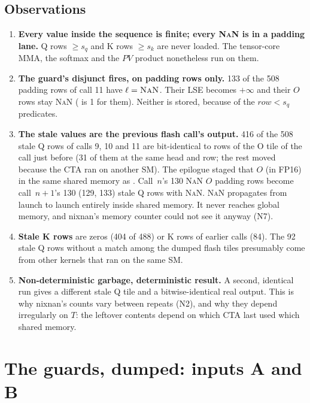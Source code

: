 \documentclass[10pt]{article}
\newcommand{\code}[1]{\texttt{\detokenize{#1}}}
\newcommand{\NaN}{\textsc{NaN}}
\begin{document}
\subsection{Observations}
\begin{enumerate}[label=\textbf{P\arabic*.}]
\item \textbf{Every value inside the sequence is finite; every \NaN{} is in a padding lane.} Q rows
  $\ge s_q$ and K rows $\ge s_k$ are never loaded. The tensor-core MMA, the softmax and the $PV$
  product nonetheless run on them.
\item \textbf{The \code{softmax.h} guard's \code{sum != sum} disjunct fires, on padding rows only.}
  133 of the 508 padding rows of call 11 have $\ell=\NaN$. Their LSE becomes $+\infty$ and their
  $O$ rows stay \NaN{} (\code{inv_sum} is 1 for them). Neither is stored, because of the
  $row<s_q$ predicates.
\item \textbf{The stale values are the previous flash call's output.} 416 of the 508 stale Q rows
  of calls 9, 10 and 11 are bit-identical to rows of the O tile of the call just before (31 of
  them at the same head and row; the rest moved because the CTA ran on another SM). The epilogue
  staged that $O$ (in FP16) in the same shared memory as \code{sQ}. Call~$n$'s 130 \NaN{} $O$
  padding rows become call~$n{+}1$'s 130 (129, 133) stale Q rows with \NaN{}. \NaN{} propagates
  from launch to launch entirely inside shared memory. It never reaches global memory, and nixnan's
  memory counter could not see it anyway (N7).
\item \textbf{Stale K rows} are zeros (404 of 488) or K rows of earlier calls (84). The 92 stale Q
  rows without a match among the dumped flash tiles presumably come from other kernels that ran on
  the same SM.
\item \textbf{Non-deterministic garbage, deterministic result.} A second, identical run gives a
  different stale Q tile and a bitwise-identical real output. This is why nixnan's counts vary
  between repeats (N2), and why they depend irregularly on $T$: the leftover contents depend on
  which CTA last used which shared memory.
\end{enumerate}

\section{The guards, dumped: inputs A and B}
\label{sec:guards}
\end{document}
